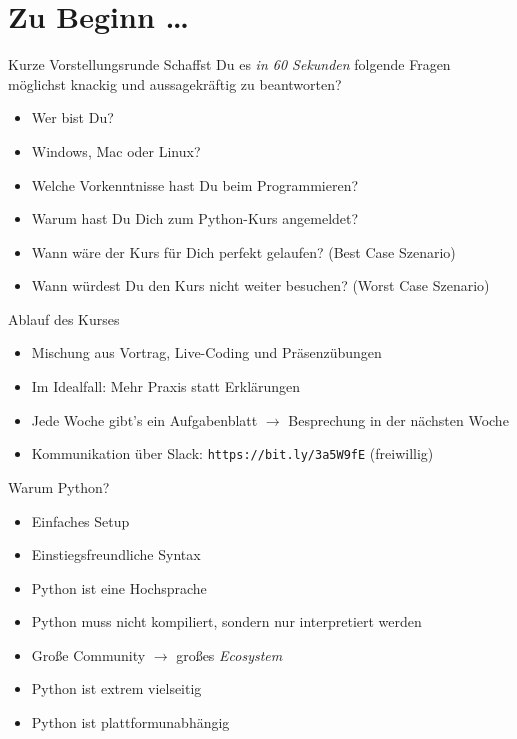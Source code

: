 \section{Zu Beginn \dots}

\begin{frame}
\begin{block}{Kurze Vorstellungsrunde}
	\vspace{2pt}
	Schaffst Du es \emph{in 60 Sekunden} folgende Fragen möglichst knackig und aussagekräftig zu beantworten?
	\begin{itemize}
		\item Wer bist Du? 
		\item Windows, Mac oder Linux?
		\item Welche Vorkenntnisse hast Du beim Programmieren?  
		\item Warum hast Du Dich zum Python-Kurs angemeldet? 
		\item Wann wäre der Kurs für Dich perfekt gelaufen? (Best Case Szenario)
		\item Wann würdest Du den Kurs nicht weiter besuchen? (Worst Case Szenario)
	\end{itemize}
\end{block}
\end{frame}


\begin{frame}
	\begin{block}{Ablauf des Kurses}
		\begin{itemize}
			\item Mischung aus Vortrag, Live-Coding und Präsenzübungen
			\item Im Idealfall: Mehr Praxis statt Erklärungen
			\item Jede Woche gibt's ein Aufgabenblatt $\rightarrow$ Besprechung in der nächsten Woche
			\item Kommunikation über Slack: \texttt{https://bit.ly/3a5W9fE} 
			(freiwillig)
		\end{itemize}
	\end{block}
\end{frame}

\begin{frame}
	\begin{block}{Warum Python?}
		\begin{itemize}
			\item Einfaches Setup
			\item Einstiegsfreundliche Syntax
			\item Python ist eine Hochsprache
			\item Python muss nicht kompiliert, sondern nur interpretiert werden
			\item Große Community $\rightarrow$ großes \emph{Ecosystem}
			\item Python ist extrem vielseitig
			\item Python ist plattformunabhängig
		\end{itemize}
	\end{block}
\end{frame}

